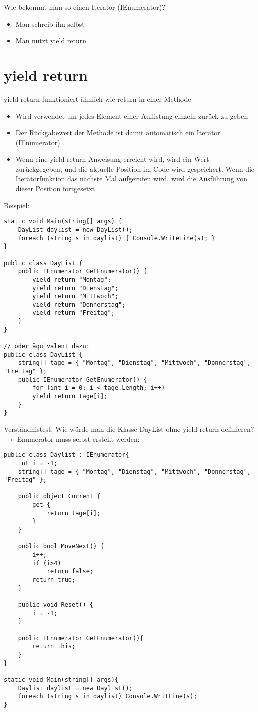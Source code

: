 Wie bekommt man so einen Iterator (IEnumerator)? 
\begin{itemize}
\item Man schreib ihn selbst
\item Man nutzt yield return
\end{itemize}

\section{yield return}
yield return funktioniert ähnlich wie return in einer Methode
\begin{itemize}
\item Wird verwendet um jedes Element einer Auflistung einzeln zurück zu geben
\item Der Rückgabewert der Methode ist damit automatisch ein Iterator (IEnumerator)
\item Wenn eine yield return-Anweisung erreicht wird, wird ein Wert zurückgegeben, und die aktuelle Position im Code wird gespeichert. Wenn die Iteratorfunktion das nächste Mal aufgerufen wird, wird die Ausführung von dieser Position fortgesetzt
\end{itemize}

Beispiel: 
\begin{lstlisting}[language={[Sharp]C}]
static void Main(string[] args) { 
	DayList daylist = new DayList(); 
	foreach (string s in daylist) { Console.WriteLine(s); } 
}

public class DayList { 
	public IEnumerator GetEnumerator() { 
		yield return "Montag"; 
		yield return "Dienstag"; 
		yield return "Mittwoch"; 
		yield return "Donnerstag"; 
		yield return "Freitag"; 
	} 
}

// oder äquivalent dazu:
public class DayList { 
	string[] tage = { "Montag", "Dienstag", "Mittwoch", "Donnerstag", "Freitag" };
	public IEnumerator GetEnumerator() { 
		for (int i = 0; i < tage.Length; i++) 
		yield return tage[i]; 
	} 
} 
\end{lstlisting}
Verständnistest: Wie würde man die Klasse DayList ohne yield return definieren? \\
$\to$ Enumerator muss selbst erstellt werden:
\begin{lstlisting}[language={[Sharp]C}]
public class Daylist : IEnumerator{
	int i = -1;
	string[] tage = { "Montag", "Dienstag", "Mittwoch", "Donnerstag", "Freitag" };
	
	public object Current { 
		get {
			return tage[i]; 
		} 
	}
	
	public bool MoveNext() {
		i++; 
		if (i>4) 
			return false; 
		return true;
	}
	
	public void Reset() {
		i = -1;
	}
	
	public IEnumerator GetEnumerator(){
		return this;
	}
}

static void Main(string[] args){
	Daylist daylist = new Daylist();
	foreach (string s in daylist) Console.WritLine(s);
}
\end{lstlisting}
